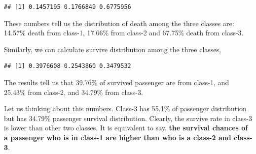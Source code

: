 \documentclass[
]{book}
\newenvironment{Shaded}{\begin{snugshade}}{\end{snugshade}}
\newcommand{\CommentTok}[1]{\textcolor[rgb]{0.56,0.35,0.01}{\textit{#1}}}
\newcommand{\DecValTok}[1]{\textcolor[rgb]{0.00,0.00,0.81}{#1}}
\newcommand{\KeywordTok}[1]{\textcolor[rgb]{0.13,0.29,0.53}{\textbf{#1}}}
\newcommand{\NormalTok}[1]{#1}
\newcommand{\OperatorTok}[1]{\textcolor[rgb]{0.81,0.36,0.00}{\textbf{#1}}}
\newcommand{\StringTok}[1]{\textcolor[rgb]{0.31,0.60,0.02}{#1}}
\begin{document}
\begin{Shaded}
\end{Shaded}

\begin{verbatim}
## [1] 0.1457195 0.1766849 0.6775956
\end{verbatim}

These numbers tell us the distribution of death among the three classes are: 14.57\% death from class-1, 17.66\% from class-2 and 67.75\% death from class-3.

Similarly, we can calculate survive distribution among the three classes,

\begin{Shaded}
\end{Shaded}

\begin{verbatim}
## [1] 0.3976608 0.2543860 0.3479532
\end{verbatim}

The results tell us that 39.76\% of survived passenger are from class-1, and 25.43\% from class-2, and 34.79\% from class-3.

Let us thinking about this numbers. Class-3 has 55.1\% of passenger distribution but has 34.79\% passenger survival distribution. Clearly, the survive rate in class-3 is lower than other two classes. It is equivalent to say, \textbf{the survival chances of a passenger who is in class-1 are higher than who is a class-2 and class-3}.
\end{document}
